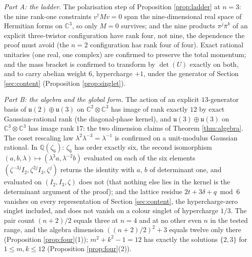 \documentclass[11pt]{article}
\theoremstyle{definition}
\newcommand{\C}{\mathbb{C}}
\newcommand{\uu}{\mathfrak{u}}
\begin{document}
\emph{Part A: the ladder.} The polarisation step of Proposition \ref{prop:ladder} at $n = 3$: the nine rank-one constraints $v^{\dagger}Mv = 0$ span the nine-dimensional real space of Hermitian forms on $\C^{3}$, so only $M = 0$ survives; and the nine products $\pi^{j}\bar\pi^{k}$ of an explicit three-twistor configuration have rank four, not nine, the dependence the proof must avoid (the $n = 2$ configuration has rank four of four). Exact rational unitaries (one real, one complex) are confirmed to preserve the total momentum; and the mass bracket is confirmed to transform by $\det(U)$ exactly on both, and to carry abelian weight $6$, hypercharge $+1$, under the generator of Section \ref{sec:content} (Proposition \ref{prop:singlet}).

\emph{Part B: the algebra and the global form.} The action of an explicit $13$-generator basis of $\uu(2) \oplus \uu(3)$ on $\C^{2} \otimes \C^{3}$ has image of rank exactly $12$ by exact Gaussian-rational rank (the diagonal-phase kernel), and $\uu(3) \oplus \uu(3)$ on $\C^{3} \otimes \C^{3}$ has image rank $17$: the two dimension claims of Theorem \ref{thm:algebra}. The coset rescaling law $\lambda^{2}\lambda^{-3} = \lambda^{-1}$ is confirmed on a unit-modulus Gaussian rational. In $\mathbb{Q}(\zeta_{6})$: $\zeta_{6}$ has order exactly six, the second isomorphism $(a, b, \lambda) \mapsto (\lambda^{3}a, \lambda^{-2}b)$ evaluated on each of the six elements $(\zeta^{-3j}I_{2}, \zeta^{2j}I_{3}, \zeta^{j})$ returns the identity with $a$, $b$ of determinant one, and evaluated on $(I_{2}, I_{3}, \zeta)$ does not (that nothing else lies in the kernel is the determinant argument of the proof); and the lattice residue $2t + 3\delta + q \bmod 6$ vanishes on every representation of Section \ref{sec:content}, the hypercharge-zero singlet included, and does not vanish on a colour singlet of hypercharge $1/3$. The pair count $(n+2)/2$ equals three at $n = 4$ and at no other even $n$ in the tested range, and the algebra dimension $((n+2)/2)^{2} + 3$ equals twelve only there (Proposition \ref{prop:four}(1)); $m^{2} + k^{2} - 1 = 12$ has exactly the solutions $\{2, 3\}$ for $1 \le m, k \le 12$ (Proposition \ref{prop:four}(2)).
\end{document}
